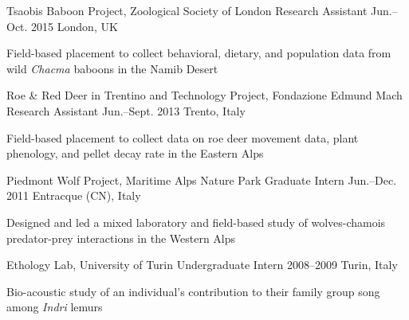 \begin{cventries}
  \cventry
    {Tsaobis Baboon Project, Zoological Society of London} %
    {Research Assistant} %
    {Jun.--Oct. 2015} %
    {London, UK} %
    {
       \begin{cvitems} %
        \item {Field-based placement to collect behavioral, dietary, and population data from wild \textit{Chacma} baboons in the Namib Desert}
      \end{cvitems}  
    }

  \cventry
    {Roe \& Red Deer in Trentino and Technology Project, Fondazione Edmund Mach} %
    {Research Assistant} %
    {Jun.--Sept. 2013} %
    {Trento, Italy} %
    {
      \begin{cvitems} %
        \item {Field-based placement to collect data on roe deer movement data, plant phenology, and pellet decay rate in the Eastern Alps}
      \end{cvitems}   
    }

  \cventry
    {Piedmont Wolf Project, Maritime Alps Nature Park} %
    {Graduate Intern} %
    {Jun.--Dec. 2011} %
    {Entracque (CN), Italy} %
    {
      \begin{cvitems} %
        \item {Designed and led a mixed laboratory and field-based study of wolves-chamois predator-prey interactions in the Western Alps}
      \end{cvitems} 
    }

  \cventry
    {Ethology Lab, University of Turin} %
    {Undergraduate Intern} %
    {2008--2009} %
    {Turin, Italy} %
    {
       \begin{cvitems} %
        \item {Bio-acoustic study of an individual's contribution to their family group song among \textit{Indri} lemurs}
      \end{cvitems} 
    }

\end{cventries}
